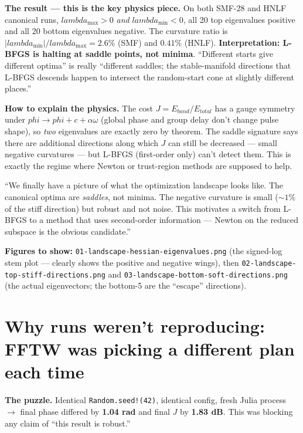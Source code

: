\documentclass[11pt,letterpaper]{article}
\def\varphi{phi}\def\lambda{lambda}\def\mathrm#1{#1}%
\begin{document}
\textbf{The result --- this is the key physics piece.} On both SMF-28 and HNLF canonical runs, $\lambda_{\max} > 0$ \emph{and} $\lambda_{\min} < 0$, all 20 top eigenvalues positive and all 20 bottom eigenvalues negative. The curvature ratio is $|\lambda_{\min}|/\lambda_{\max} = 2.6\%$ (SMF) and $0.41\%$ (HNLF). \textbf{Interpretation: L-BFGS is halting at saddle points, not minima}. ``Different starts give different optima'' is really ``different saddles; the stable-manifold directions that L-BFGS descends happen to intersect the random-start cone at slightly different places.''

\textbf{How to explain the physics.} The cost $J = E_{\mathrm{band}}/E_{\mathrm{total}}$ has a gauge symmetry under $\varphi \to \varphi + c + \alpha \omega$ (global phase and group delay don't change pulse shape), so \emph{two} eigenvalues are exactly zero by theorem. The saddle signature says there are additional directions along which $J$ can still be decreased --- small negative curvatures --- but L-BFGS (first-order only) can't detect them. This is exactly the regime where Newton or trust-region methods are supposed to help.

\begin{say}
``We finally have a picture of what the optimization landscape looks like. The canonical optima are \emph{saddles}, not minima. The negative curvature is small ($\sim 1\%$ of the stiff direction) but robust and not noise. This motivates a switch from L-BFGS to a method that uses second-order information --- Newton on the reduced subspace is the obvious candidate.''
\end{say}

\textbf{Figures to show:} \texttt{01-landscape-hessian-eigenvalues.png} (the signed-log stem plot --- clearly shows the positive and negative wings), then \texttt{02-landscape-top-stiff-directions.png} and \texttt{03-landscape-bottom-soft-directions.png} (the actual eigenvectors; the bottom-5 are the ``escape'' directions).

\section{Why runs weren't reproducing: FFTW was picking a different plan each time}

\textbf{The puzzle.} Identical \texttt{Random.seed!(42)}, identical config, fresh Julia process $\to$ final phase differed by \textbf{1.04 rad} and final $J$ by \textbf{1.83 dB}. This was blocking any claim of ``this result is robust.''
\end{document}
